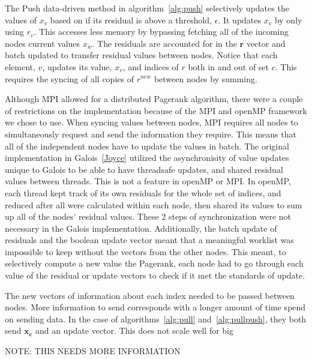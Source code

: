 \documentclass[letterpaper,12pt,onecolumn]{article}
\begin{document}
The Push data-driven method in algorithm~\ref{alg:push} selectively updates the values of $x_v$ based on if its residual is above a threshold, $\epsilon$. It updates $x_v$ by only using $r_v$. This accesses less memory by bypassing fetching all of the incoming nodes current values $x_w$. The residuals are accounted for in the $\mathbf{r}$ vector and batch updated to transfer residual values between nodes. Notice that each element, $v$, updates its value, $x_v$, and indices of $r$ both in and out of set $c$. This requires the syncing of all copies of $r^{new}$ between nodes by summing. 

Although MPI allowed for a distributed Pagerank algorithm, there were a couple of restrictions on the implementation because of the MPI and openMP framework we chose to use. When syncing values between nodes, MPI requires all nodes to simultaneously request and send the information they require. This means that all of the independent nodes have to update the values in batch. The original implementation in Galois~\ref{Joyce} utilized the asynchronisity of value updates unique to Galois to be able to have threadsafe updates, and shared residual values between threads. This is not a feature in openMP or MPI. In openMP, each thread kept track of its own residuals for the whole set of indices, and reduced after all were calculated within each node, then shared its values to sum up all of the nodes' residual values. These 2 steps of synchronization were not necessary in the Galois implementation. Additionally, the batch update of residuals and the boolean update vector meant that a meaningful worklist was impossible to keep without the vectors from the other nodes. This meant, to selectively compute a new value the Pagerank, each node had to go through each value of the residual or update vectors to check if it met the standards of update. 

The new vectors of information about each index needed to be passed between nodes. More information to send corresponds with a longer amount of time spend on sending data. In the case of algorithms~\ref{alg:pull} and~\ref{alg:pullpush}, they both send $\mathbf{x_c}$ and an update vector. This does not scale well for big 

NOTE: THIS NEEDS MORE INFORMATION 
\end{document}

